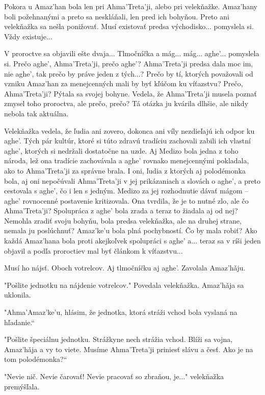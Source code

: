 \documentclass{book}
\begin{document}
Pokora u Amaz'han bola len pri Ahma'Treta'ji, alebo pri velekňažke. Amaz'hany boli požehnanými a preto sa neskláňali, len pred ich bohyňou. Preto ani velekňažka sa nešla ponižovať. Musí existovať predsa východisko... pomyslela si. Vždy existuje...

V proroctve sa objavili ešte dvaja... Tlmočníčka a mág... mág... aghe'... pomyslela si. Prečo aghe', Ahma'Treta'ji, prečo aghe'? Ahma'Treta'ji predsa dala moc im, nie aghe', tak prečo by práve jeden z tých...? Prečo by tí, ktorých považovali od vzniku Amaz'han za menejcenných mali by byť kľúčom ku víťazstvu? Prečo, Ahma'Treta'ji? Pýtala sa svojej bohyne. Vedela, že Ahma'Treta'ji musela poznať zmysel toho proroctva, ale prečo, prečo? Tá otázka ju kvárila dlhšie, ale nikdy nebola tak aktuálna.

Velekňažka vedela, že ľudia ani zovero, dokonca ani víly nezdieľajú ich odpor ku aghe'. Tých pár kultúr, ktoré si túto zdravú tradíciu zachovali zabili ich vlastní aghe', ktorých si nedržali dostatočne na uzde. Aj Medizo bola jedna z toho národa, lež ona tradície zachovávala a aghe' rovnako menejcennými pokladala, ako to Ahma'Treta'ji za správne brala. I oni, ľudia z ktorých aj polodémonka bola, aj oni nepočúvali Ahma'Treta'ji v jej prikázaniach a slovách o aghe', a preto cestovala s aghe', čo i len s jedným. Medizo za jej rozhodnutie dávať mágom – aghe' rovnocenné postavenie kritizovala. Ona tvrdila, že je to nutné zlo, ale čo Ahma'Treta'ji? Spolupráca z aghe' bola zrada a teraz to žiadala aj od nej? Nemohla zradiť svoju bohyňu, bola predsa velekňažka, ale na druhej strane, nemala ju poslúchnuť? Amaz'ke'u bola plná pochybností. Čo by mala robiť? Ako každá Amaz'hana bola proti akejkoľvek spolupráci s aghe' a... teraz sa v ríši jeden objavil a podľa proroctiev mal byť článkom k víťazstvu...

Musí ho nájsť. Oboch votrelcov. Aj tlmočníčku aj aghe'. Zavolala Amaz'ha\v{}ju.

"$ $Pošlite jednotku na nájdenie votrelcov."$ $ Povedala velekňažka. Amaz'ha\v{}ja sa uklonila.

"$ $Ahma'Amaz'ke'u, hlásim, že jednotka, ktorá stráži vchod bola vyslaná na hľadanie.“

"$ $Pošlite špeciálnu jednotku. Strážkyne nech strážia vchod. Blíži sa vojna, Amaz'ha\v{}ja a vy to viete. Musíme Ahma'Treta'ji priniesť slávu a česť. Ako je na tom polodémonka?“

"$ $Nevie nič. Nevie čarovať! Nevie pracovať so zbraňou, je..."$ $ velekňažka premýšľala.
\end{document}
